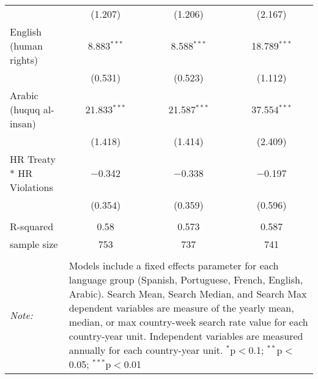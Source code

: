 \begin{table}[!htbp]
\begin{tabular}{@{\extracolsep{5pt}}lccc}
  & (1.207) & (1.206) & (2.167) \\ 
  English (human rights) & 8.883$^{***}$ & 8.588$^{***}$ & 18.789$^{***}$ \\ 
  & (0.531) & (0.523) & (1.112) \\ 
  Arabic (huquq al-insan) & 21.833$^{***}$ & 21.587$^{***}$ & 37.554$^{***}$ \\ 
  & (1.418) & (1.414) & (2.409) \\ 
  HR Treaty * HR Violations & $-$0.342 & $-$0.338 & $-$0.197 \\ 
  & (0.354) & (0.359) & (0.596) \\ 
 \hline \\[-1.8ex] 
R-squared  & 0.58 & 0.573 & 0.587 \\ 
sample size  & 753 & 737 & 741 \\ 
\hline 
\hline \\[-1.8ex] 
\textit{Note:}  & \multicolumn{3}{l}{\parbox[t]{8cm}{Models include a fixed effects parameter for each language group (Spanish, Portuguese, French, English, Arabic). Search Mean, Search Median, and Search Max dependent variables are measure of the yearly mean, median, or max country-week search rate value for each country-year unit. Independent variables are measured annually for each country-year unit. $^{*}$p$<$0.1; $^{**}$p$<$0.05; $^{***}$p$<$0.01}} \\ 
\end{tabular} 
\end{table} 

